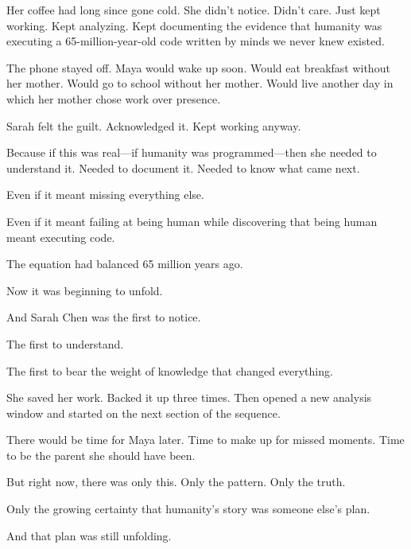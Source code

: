 Her coffee had long since gone cold. She didn't notice. Didn't care. Just kept working. Kept analyzing. Kept documenting the evidence that humanity was executing a 65-million-year-old code written by minds we never knew existed.

The phone stayed off. Maya would wake up soon. Would eat breakfast without her mother. Would go to school without her mother. Would live another day in which her mother chose work over presence.

Sarah felt the guilt. Acknowledged it. Kept working anyway.

Because if this was real—if humanity was programmed—then she needed to understand it. Needed to document it. Needed to know what came next.

Even if it meant missing everything else.

Even if it meant failing at being human while discovering that being human meant executing code.

The equation had balanced 65 million years ago.

Now it was beginning to unfold.

And Sarah Chen was the first to notice.

The first to understand.

The first to bear the weight of knowledge that changed everything.

She saved her work. Backed it up three times. Then opened a new analysis window and started on the next section of the sequence.

There would be time for Maya later. Time to make up for missed moments. Time to be the parent she should have been.

But right now, there was only this. Only the pattern. Only the truth.

Only the growing certainty that humanity's story was someone else's plan.

And that plan was still unfolding.

